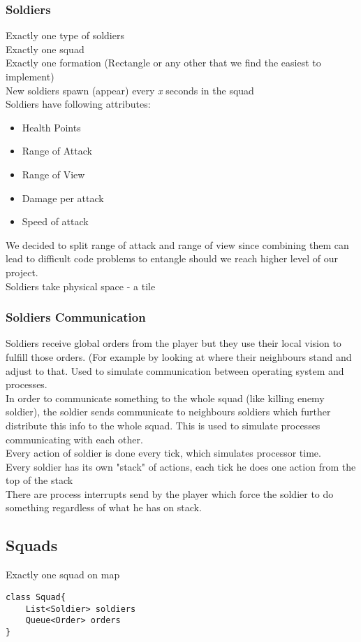 \documentclass{article}
\begin{document}
\subsubsection{Soldiers}
Exactly one type of soldiers \\ 
Exactly one squad \\
Exactly one formation (Rectangle or any other that we find the easiest to implement) \\
New soldiers spawn (appear) every \textit{x} seconds in the squad \\
Soldiers have following attributes: 
\begin{itemize}
\item Health Points
\item Range of Attack 
\item Range of View
\item Damage per attack 
\item Speed of attack
\end{itemize}
We decided to split range of attack and range of view since combining them can lead to difficult code problems to entangle should we reach higher level of our project. \\
Soldiers take physical space - a tile \\ 

\subsubsection{Soldiers Communication}
Soldiers receive global orders from the player but they use their local vision to fulfill those orders. (For example by looking at where their neighbours stand and adjust to that. Used to simulate communication between operating system and processes. \\ 
In order to communicate something to the whole squad (like killing enemy soldier), the soldier sends communicate to neighbours soldiers which further distribute this info to the whole squad. This is used to simulate processes communicating with each other. \\ 
Every action of soldier is done every tick, which simulates processor time. \\ 
Every soldier has its own "stack" of actions, each tick he does one action from the top of the stack \\
There are process interrupts send by the player which force the soldier to do something regardless of what he has on stack. 

\subsection{Squads}
Exactly one squad on map \\
\begin{lstlisting}[caption={Pseudo-code for Squad class}]
class Squad{
    List<Soldier> soldiers
    Queue<Order> orders 
}
\end{lstlisting}
\end{document}
